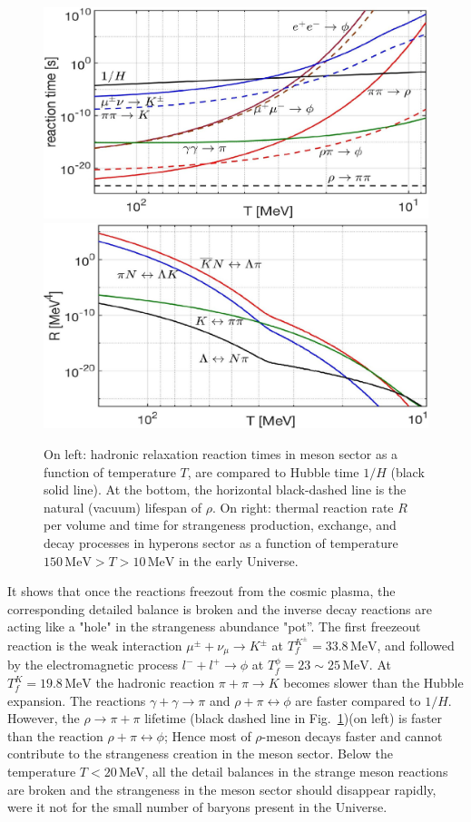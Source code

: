 \documentclass[universe,article,submit,moreauthors,pdftex,a4paper]{Definitions/mdpi}
\begin{document}
\begin{itemize}
\begin{figure}[ht]
\centering
\includegraphics[width=0.49\linewidth]{Strangeness_Hubble_C.jpg}
\includegraphics[width=0.49\linewidth]{NewHyperonRate_C.jpg}
\caption{On left: hadronic relaxation reaction times in meson sector as a function of temperature $T$, are compared to Hubble time $1/H$ (black solid line). At the bottom, the horizontal black-dashed line is the natural (vacuum) lifespan of $\rho$. On right: thermal reaction rate $R$ per volume and time for strangeness production, exchange, and decay processes in hyperons sector as a function of temperature $150\,\mathrm{MeV}> T>10\,\mathrm{MeV}$ in the early Universe.}
\label{reaction_time_tot}
\end{figure}
It shows that once the reactions freezout from the cosmic plasma, the corresponding detailed balance is broken and the inverse decay reactions are acting like a "hole" in the strangeness abundance "pot”.
The first freezeout reaction is the weak interaction $\mu^\pm+\nu_{\mu}\rightarrow K^\pm$ at $T_f^{K^\pm}=33.8\,\mathrm{MeV}$, and followed by the electromagnetic process $l^-+l^+\rightarrow\phi$ at $T_f^\phi=23\sim25\,\mathrm{MeV}$. At $T_f^K=19.8\,\mathrm{MeV}$ the hadronic reaction $\pi+\pi\rightarrow K$ becomes slower than the Hubble expansion. The reactions $\gamma+\gamma\rightarrow\pi$ and $\rho+\pi\leftrightarrow\phi$ are faster compared to $1/H$. However, the $\rho\to\pi+\pi$ lifetime (black dashed line in Fig.~\ref{reaction_time_tot})(on left) is faster than the reaction $\rho+\pi\leftrightarrow\phi$; Hence most of $\rho$-meson decays faster and cannot contribute to the strangeness creation in the meson sector. Below the temperature $T<20$\,MeV, all the detail balances in the strange meson reactions are broken and the strangeness in the meson sector should disappear rapidly, were it not for the small number of baryons present in the Universe.

\end{itemize}
\end{document}
